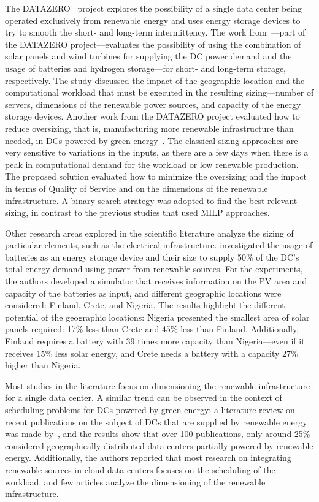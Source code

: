 The DATAZERO~\citep{datazero} project explores the possibility of a single data center being operated exclusively from renewable energy and uses energy storage devices to try to smooth the short- and long-term intermittency. The work from~\citet{HADDAD2021100505}---part of the DATAZERO project---evaluates the possibility of using the combination of solar panels and wind turbines for supplying the DC power demand and the usage of batteries and hydrogen storage---for short- and long-term storage, respectively. The study discussed the impact of the geographic location and the computational workload that must be executed in the resulting sizing---number of servers, dimensions of the renewable power sources, and capacity of the energy storage devices. Another work from the DATAZERO project evaluated how to reduce oversizing, that is, manufacturing more renewable infrastructure than needed, in DCs powered by green energy~\citep{manal2022}. The classical sizing approaches are very sensitive to variations in the inputs, as there are a few days when there is a peak in computational demand for the workload or low renewable production. The proposed solution evaluated how to minimize the oversizing and the impact in terms of Quality of Service and on the dimensions of the renewable infrastructure. A binary search strategy was adopted to find the best relevant sizing, in contrast to the previous studies that used MILP approaches.

Other research areas explored in the scientific literature analyze the sizing of particular elements, such as the electrical infrastructure. \citet{sheme2018_batsize} investigated the usage of batteries as an energy storage device and their size to supply 50\% of the DC's total energy demand using power from renewable sources. For the experiments, the authors developed a simulator that receives information on the PV area and capacity of the batteries as input, and different geographic locations were considered: Finland, Crete, and Nigeria. The results highlight the different potential of the geographic locations: Nigeria presented the smallest area of solar panels required: 17\% less than Crete and 45\% less than Finland. Additionally, Finland requires a battery with 39 times more capacity than Nigeria---even if it receives 15\% less solar energy, and Crete needs a battery with a capacity 27\% higher than Nigeria.

Most studies in the literature focus on dimensioning the renewable infrastructure for a single data center. A similar trend can be observed in the context of scheduling problems for DCs powered by green energy:  a literature review on recent publications on the subject of DCs that are supplied by renewable energy was made by~\citet{SONG2022326}, and the results show that over 100 publications, only around 25\% considered geographically distributed data centers partially powered by renewable energy. Additionally, the authors reported that most research on integrating renewable sources in cloud data centers focuses on the scheduling of the workload, and few articles analyze the dimensioning of the renewable infrastructure.

